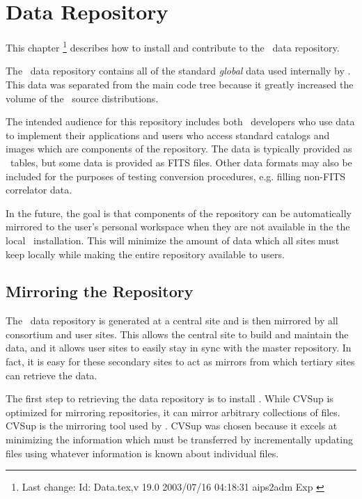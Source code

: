 \chapter{Data Repository}
\label{data repository}

This chapter \footnote{Last change:
$ $Id: Data.tex,v 19.0 2003/07/16 04:18:31 aips2adm Exp $ $}
describes how to install and contribute to the \aipspp\ data repository.

The \aipspp\ data repository contains all of the standard \textit{global}
data used internally by \aipspp. This data was separated from the main code tree
because it greatly increased the volume of the \aipspp\ source distributions.

The intended audience for this repository includes both \aipspp\ developers
who use data to implement their applications and users who access standard
catalogs and images which are components of the repository. The data is
typically provided as \aipspp\ tables, but some data is provided as FITS
files. Other data formats may also be included for the purposes of testing
conversion procedures, e.g. filling non-FITS correlator data.

In the future, the goal is that components of the repository can be
automatically mirrored to the user's personal workspace when they are not
available in the the local \aipspp\ installation. This will minimize the
amount of data which all sites must keep locally while making the entire
repository available to users.


\section{Mirroring the Repository}
\label{data repository mirroring}

The \aipspp\ data repository is generated at a central site and is then
mirrored by all consortium and user sites. This allows the central site
to build and maintain the data, and it allows user sites to easily stay
in sync with the master repository. In fact, it is easy for these secondary
sites to act as mirrors from which tertiary sites can retrieve the data.

The first step to retrieving the data repository is to install
. While
CVSup is optimized for mirroring 
repositories, it can mirror arbitrary collections of files. CVSup is the mirroring
tool used by . CVSup
was chosen because it excels at minimizing the information which must be
transferred by incrementally updating files using whatever information is
known about individual files.

